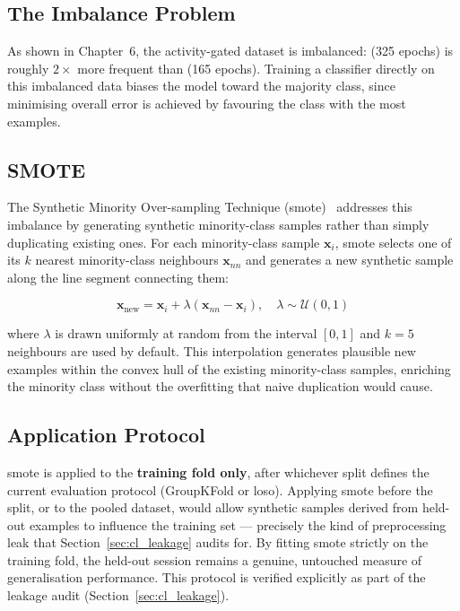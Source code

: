 \subsection{The Imbalance Problem}

As shown in Chapter~6, the activity-gated dataset is imbalanced:
 (325 epochs) is roughly $2\times$ more
frequent than  (165 epochs). Training a classifier
directly on this imbalanced data biases the model toward the
majority class, since minimising overall error is achieved by
favouring the class with the most examples.

\subsection{SMOTE}

The Synthetic Minority Over-sampling Technique
(\acrshort{smote})~\cite{chawla2002smote} addresses this imbalance
by generating synthetic minority-class samples rather than simply
duplicating existing ones. For each minority-class sample
$\mathbf{x}_i$, \acrshort{smote} selects one of its $k$ nearest
minority-class neighbours $\mathbf{x}_{nn}$ and generates a new
synthetic sample along the line segment connecting them:

\begin{equation}
\mathbf{x}_{\text{new}} = \mathbf{x}_i + \lambda
\left(\mathbf{x}_{nn} - \mathbf{x}_i\right),
\quad \lambda \sim \mathcal{U}(0, 1)
\label{eq:smote}
\end{equation}

\noindent where $\lambda$ is drawn uniformly at random from the
interval $[0, 1]$ and $k = 5$ neighbours are used by default. This
interpolation generates plausible new examples within the convex
hull of the existing minority-class samples, enriching the minority
class without the overfitting that naive duplication would cause.

\subsection{Application Protocol}

\acrshort{smote} is applied to the \textbf{training fold only},
after whichever split defines the current evaluation protocol
(GroupKFold or \acrshort{loso}). Applying \acrshort{smote} before
the split, or to the pooled dataset, would allow synthetic samples
derived from held-out examples to influence the training set ---
precisely the kind of preprocessing leak that
Section~\ref{sec:cl_leakage} audits for. By fitting \acrshort{smote}
strictly on the training fold, the held-out session remains a
genuine, untouched measure of generalisation performance. This
protocol is verified explicitly as part of the leakage audit
(Section~\ref{sec:cl_leakage}).

